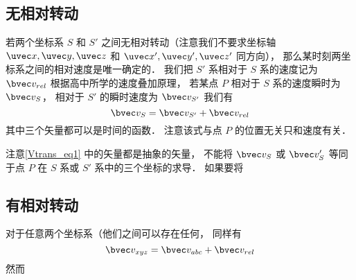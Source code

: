 


\subsection{无相对转动}
若两个坐标系 $S$ 和 $S'$ 之间无相对转动（注意我们不要求坐标轴 $\uvec x, \uvec y, \uvec z$ 和 $\uvec x', \uvec y', \uvec z'$ 同方向）， 那么某时刻两坐标系之间的相对速度是唯一确定的． 我们把 $S'$ 系相对于 $S$ 系的速度记为 $\bvec v_{rel}$ 根据高中所学的速度叠加原理， 若某点 $P$ 相对于 $S$ 系的速度瞬时为 $\bvec v_S$， 相对于 $S'$ 的瞬时速度为 $\bvec v_{S'}$ 我们有
\begin{equation}\label{Vtrans_eq1}
\bvec v_{S} = \bvec v_{S'} + \bvec v_{rel}
\end{equation}
其中三个矢量都可以是时间的函数． 注意该式与点 $P$ 的位置无关只和速度有关．

注意\autoref{Vtrans_eq1} 中的矢量都是抽象的矢量， 不能将 $\bvec v_S$ 或 $\bvec v_S'$ 等同于点 $P$ 在 $S$ 系或 $S'$ 系中的三个坐标的求导． 如果要将

\subsection{有相对转动}
对于任意两个坐标系（他们之间可以存在任何， 同样有
\begin{equation}
\bvec v_{xyz} = \bvec v_{abc} + \bvec v_{rel}
\end{equation}
然而
